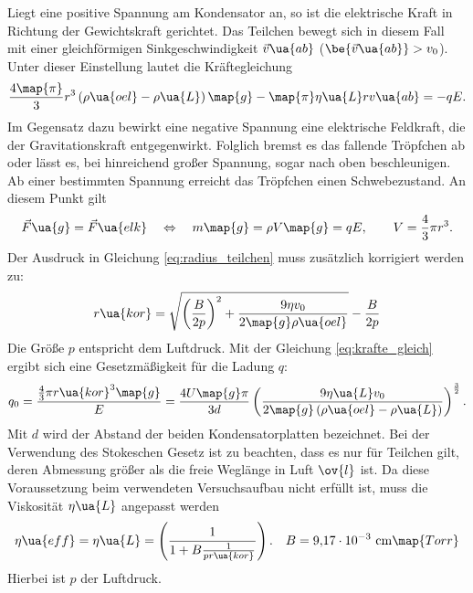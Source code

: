Liegt eine positive Spannung am Kondensator an, so ist die elektrische Kraft in Richtung der Gewichtskraft gerichtet. %
Das Teilchen bewegt sich in diesem Fall mit einer gleichförmigen Sinkgeschwindigkeit $\vec{v}\ua{ab}$ ($\be{\vec{v}\ua{ab}}>v_0$).
Unter dieser Einstellung lautet die Kräftegleichung
\begin{equation}
  \label{eq:kraefte_eins}
    \frac{4\map{\pi}}{3}r^3\left(\rho\ua{oel}-\rho\ua{L}\right)\map{g}-\map{\pi}\eta\ua{L}r v\ua{ab}=-qE.
\end{equation}
Im Gegensatz dazu bewirkt eine negative Spannung eine elektrische Feldkraft, die der Gravitationskraft
entgegenwirkt. Folglich bremst es das fallende Tröpfchen ab oder
lässt es, bei hinreichend großer Spannung, sogar nach oben beschleunigen. %
Ab einer bestimmten Spannung erreicht das Tröpfchen einen Schwebezustand. An diesem %
Punkt gilt
\begin{equation}
  \label{eq:krafte_gleich}
  \vec{F}\ua{g}=\vec{F}\ua{elk} \quad \Leftrightarrow \quad m\map{g}=\rho V\map{g}=qE, \qquad V=\frac{4}{3}\pi r^3.
\end{equation}
Der Ausdruck in Gleichung \eqref{eq:radius_teilchen} muss zusätzlich korrigiert werden zu:
\begin{equation}
    \label{eq:q_korri}
    r\ua{kor}=\sqrt{\left(\frac{B}{2p}\right)^2+\frac{9\eta v_0}{2\map{g}\rho\ua{oel}}}-\frac{B}{2 p}
\end{equation}
Die Größe $p$ entspricht dem Luftdruck.
Mit der Gleichung \eqref{eq:krafte_gleich} ergibt sich eine Gesetzmäßigkeit für die Ladung $q$:
\begin{equation}%
  \label{eq:q}
  q_0=\frac{\frac{4}{3}\pi r\ua{kor}^3 \map{g}}{E} = \frac{4U\map{g}\pi}{3d}\left( \frac{9\eta\ua{L}v_0}{2\map{g}\left(\rho\ua{oel}-\rho\ua{L}\right)}\right)^{\frac{3}{2}} .
\end{equation}
Mit $d$ wird der Abstand der beiden Kondensatorplatten bezeichnet.%
Bei der Verwendung des Stokeschen Gesetz ist zu beachten, dass es nur für Teilchen gilt,%
deren Abmessung größer als die freie Weglänge in Luft $\ov{l}$ ist. %
Da diese Voraussetzung beim verwendeten Versuchsaufbau nicht erfüllt ist, muss die Viskosität $\eta\ua{L}$ %
angepasst werden %
\begin{equation*}
  \eta\ua{eff}=\eta\ua{L}=\left(\frac{1}{1+B\frac{1}{pr\ua{kor}}}\right). \quad B=\SI{9.17e-3}\,\si{\centi\meter}\map{Torr}
\end{equation*}
Hierbei ist $p$ der Luftdruck.
